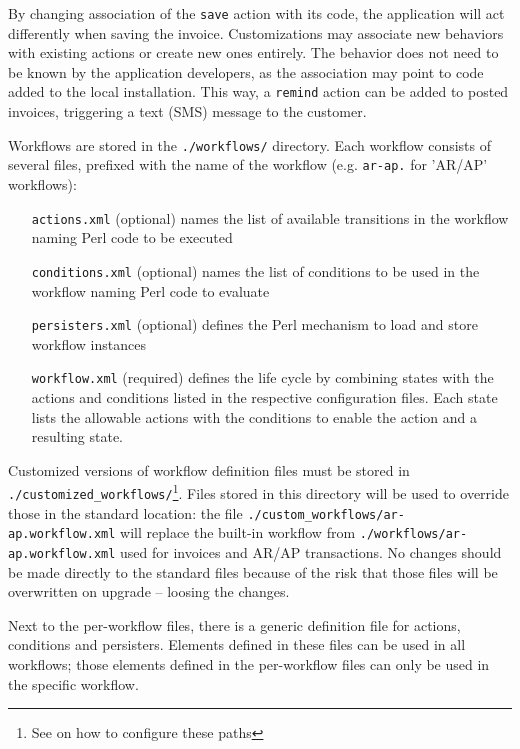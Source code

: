 By changing association of the \texttt{save} action with its code, the application will act
differently when saving the invoice.  Customizations may associate new behaviors with existing
actions or create new ones entirely.  The behavior does not need to be known by the application
developers, as the association may point to code added to the local installation.  This way, a
\texttt{remind} action can be added to posted invoices, triggering a text (SMS) message to the
customer.


Workflows are stored in the \texttt{./workflows/} directory.  Each workflow consists of
several files, prefixed with the name of the workflow (e.g. \texttt{ar-ap.} for 'AR/AP' workflows):

\begin{enumerate}
	\item [\texttt{actions.xml}] (optional) names the list of available transitions
	in the workflow naming Perl code to be executed
	\item [\texttt{conditions.xml}] (optional) names the list of conditions to be used
	in the workflow naming Perl code to evaluate
	\item [\texttt{persisters.xml}] (optional) defines the Perl mechanism to load and store
	workflow instances
	\item [\texttt{workflow.xml}] (required) defines the life cycle by combining states with
	the actions and conditions listed in the respective configuration files. Each state lists
	the allowable actions with the conditions to enable the action and a resulting state.
\end{enumerate}

Customized versions of workflow definition files must be stored in
 \texttt{./customized\_workflows/}\footnote{See
 	 on how to configure
 these paths}.  Files stored in this directory will be used to override those in
the standard location: the file \texttt{./custom\_workflows/ar-ap.workflow.xml} will replace the built-in workflow
from \texttt{./workflows/ar-ap.workflow.xml} used for invoices and AR/AP transactions.
No changes should be made directly to the standard files because of the risk that those
files will be overwritten on upgrade -- loosing the changes.

Next to the per-workflow files, there is a generic definition file for actions,
conditions and persisters.  Elements defined in these files can be used in all
workflows; those elements defined in the per-workflow files can only be used
in the specific workflow.

